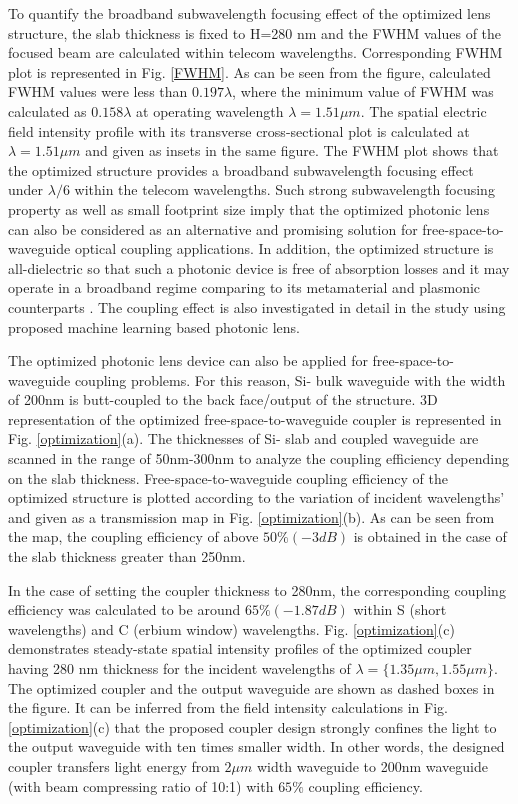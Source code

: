 \documentclass[9pt,twocolumn,twoside]{article}
\begin{document}
  To quantify the broadband subwavelength focusing effect of the optimized lens structure, the slab thickness is fixed to H=280 nm and the FWHM values of the focused beam are calculated within telecom wavelengths. Corresponding FWHM plot is represented in Fig. \ref{FWHM}. As can be seen from the figure, calculated FWHM values were less than $0.197\lambda$, where the minimum value of FWHM was calculated as $0.158\lambda$ at operating wavelength $\lambda={1.51\mu m}$. The spatial electric field intensity profile with its transverse cross-sectional plot is calculated at $\lambda={1.51\mu m}$ and given as insets in the same figure. The FWHM plot shows that the optimized structure provides a broadband subwavelength focusing effect under $\lambda /6$ within the telecom wavelengths. Such strong subwavelength focusing property as well as small footprint size imply that the optimized photonic lens can also be considered as an alternative and promising solution for free-space-to-waveguide optical coupling applications. In addition, the optimized structure is all-dielectric so that such a photonic device is free of absorption losses and it may operate in a broadband regime comparing to its metamaterial and plasmonic counterparts \cite{turduev2016focusing, Nalimov2013}. The coupling effect is also investigated in detail in the study using proposed machine learning based photonic lens.
  

  The optimized photonic lens device can also be applied for free-space-to-waveguide coupling problems. For this reason, Si- bulk waveguide with the width of 200nm is butt-coupled to the back face/output of the structure.  3D representation of the optimized free-space-to-waveguide coupler is represented in  Fig. \ref{optimization}(a). The thicknesses of Si- slab and coupled waveguide are scanned in the range of 50nm-300nm to analyze the coupling efficiency depending on the slab thickness. Free-space-to-waveguide coupling efficiency of the optimized structure is plotted according to the variation of incident wavelengths' and given as a transmission map in Fig. \ref{optimization}(b). As can be seen from the map, the coupling efficiency of above $50\% (-3dB)$ is obtained in the case of the slab thickness greater than 250nm. 
  
  In the case of setting the coupler thickness to 280nm, the corresponding coupling efficiency was calculated to be around $65\% (-1.87dB)$ within S (short wavelengths) and C (erbium window) wavelengths. Fig. \ref{optimization}(c) demonstrates steady-state spatial intensity profiles of the optimized coupler having 280 nm thickness for the incident wavelengths of $\lambda=\{1.35\mu m,1.55\mu m\}$. The optimized coupler and the output waveguide are shown as dashed boxes in the figure. It can be inferred from the field intensity calculations in Fig. \ref{optimization}(c) that the proposed coupler design strongly confines the light to the output waveguide with ten times smaller width. In other words, the designed coupler transfers light energy from $2\mu m$ width waveguide to 200nm waveguide (with beam compressing ratio of 10:1) with $65\%$ coupling efficiency.
  
\end{document}
